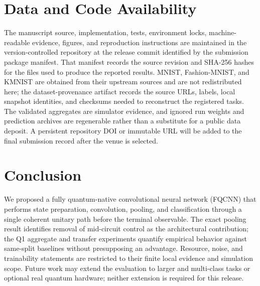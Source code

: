 \documentclass[conference]{IEEEtran}
\begin{document}
\section*{Data and Code Availability}
The manuscript source, implementation, tests, environment locks, machine-readable
evidence, figures, and reproduction instructions are maintained in the
version-controlled repository at the release commit identified by the submission
package manifest.  That manifest records the source revision and SHA-256 hashes
for the files used to produce the reported results.  MNIST, Fashion-MNIST, and
KMNIST are obtained from their upstream sources and are not redistributed here;
the dataset-provenance artifact records the source URLs, labels, local snapshot
identities, and checksums needed to reconstruct the registered tasks.  The
validated aggregates are simulator evidence, and ignored run weights and
prediction archives are regenerable rather than a substitute for a public data
deposit.  A persistent repository DOI or immutable URL will be added to the
final submission record after the venue is selected.

\section{Conclusion}
We proposed a fully quantum-native convolutional neural network (FQCNN) that performs state preparation, convolution, pooling, and classification through a single coherent unitary path before the terminal observable. The exact pooling result identifies removal of mid-circuit control as the architectural contribution; the Q1 aggregate and transfer experiments quantify empirical behavior against same-split baselines without presupposing an advantage. Resource, noise, and trainability statements are restricted to their finite local evidence and simulation scope. Future work may extend the evaluation to larger and multi-class tasks or optional real quantum hardware; neither extension is required for this release.
\end{document}
